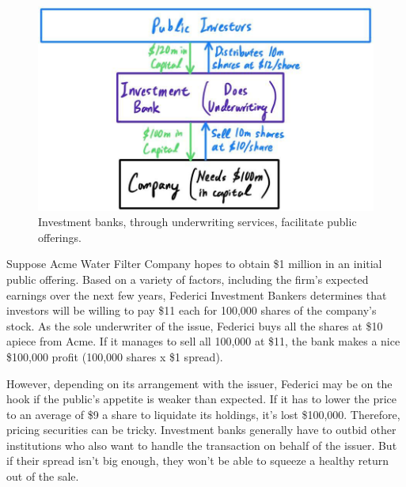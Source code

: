 \documentclass{article}
\begin{document}
    \begin{figure}[H]
      \centering 
      \includegraphics[scale=0.27]{img/Investment_bank_underwriting.jpg}
      \caption{Investment banks, through underwriting services, facilitate public offerings.} 
      \label{fig:investment_bank_underwriting}
    \end{figure}

    \begin{example}
      Suppose Acme Water Filter Company hopes to obtain \$1 million in an initial public offering. Based on a variety of factors, including the firm’s expected earnings over the next few years, Federici Investment Bankers determines that investors will be willing to pay \$11 each for 100,000 shares of the company’s stock. As the sole underwriter of the issue, Federici buys all the shares at \$10 apiece from Acme. If it manages to sell all 100,000 at \$11, the bank makes a nice \$100,000 profit (100,000 shares x \$1 spread). 

      However, depending on its arrangement with the issuer, Federici may be on the hook if the public’s appetite is weaker than expected. If it has to lower the price to an average of \$9 a share to liquidate its holdings, it’s lost \$100,000. Therefore, pricing securities can be tricky. Investment banks generally have to outbid other institutions who also want to handle the transaction on behalf of the issuer. But if their spread isn’t big enough, they won’t be able to squeeze a healthy return out of the sale. 
    \end{example}
\end{document}
